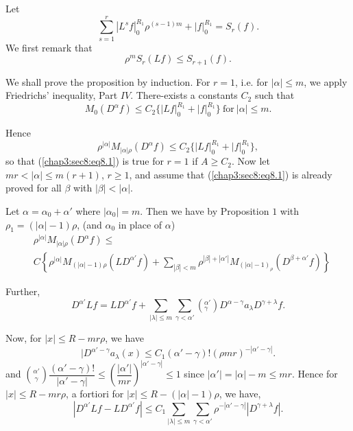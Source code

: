 Let
$$
\sum^r_{s=1} | L^s f |^{R_1}_0 \rho^{(s-1)m} + | f|^{R_1}_0 = S_r (f).
$$
We first remark that 
\begin{equation}
\rho^m S_r (Lf) \leq S_{r+1} (f). \tag{8.3}\label{chap3:sec8:eq8.3}
\end{equation}

We shall prove the proposition by induction. For $r = 1$, i.e. for
$|\alpha| \leq m$, we apply Friedrichs' inequality, Part
$IV$. There-exists a constants $C_2$ such that 
$$
M_0 (D^ \alpha f) \leq C_2 \{ |L f|^{R_1}_0 + |f|^{R_1}_0 \} ~
\text{for} ~ |\alpha| \leq m. 
$$

Hence
$$
\rho^{|\alpha|} M_{| \alpha | \rho} (D^\alpha f) \leq C_2 \{
|Lf|^{R_1}_0 + | f |^{R_1}_0 \}, 
$$
so that (\ref{chap3:sec8:eq8.1}) is true for $r = 1$ if $A \geq C_2$. Now let $mr < |
\alpha| \leq m (r+1)$, $ r \geq 1$, and assume that (\ref{chap3:sec8:eq8.1}) is already
proved for all $\beta$ with $| \beta | < | \alpha |$. 

Let $\alpha = \alpha_0 + \alpha '$ where $| \alpha_0 | = m$. Then we
have by Proposition $1$ with $\rho_1 = (| \alpha| - 1) \rho$,
(and $\alpha_0$ in place of $\alpha$)  
\begin{align*}
&\rho^{|\alpha |} M_{|\alpha | \rho} (D^ \alpha f) \leq\\ 
&C \left\{
  \rho^{|\alpha |} M_{(|\alpha | - 1) \rho} (LD^{\alpha '} f) +
  \sum_{|\beta | < m} \rho^{|\beta | + |\alpha ' |} M_{(|\alpha | -
    1)_\rho} \left(D^{\beta + \alpha'} f\right) \right\}
  \tag{8.4}\label{chap3:sec8:eq8.4}  
\end{align*}

Further,\pageoriginale
$$
D^{\alpha'} Lf = L D^{\alpha'} f + \sum_{|\lambda | \leq m}
\sum_{\gamma < \alpha '} (^{\alpha '}_{\gamma}) D^{\alpha - \gamma} a_
\lambda D^{\gamma + \lambda} f. 
$$

Now, for $|x| \leq R - mr \rho$, we have
$$
|D^{\alpha ' - \gamma} a_{\lambda}(x) \leq C_1 (\alpha ' - \gamma) !
(\rho mr)^{-|\alpha' - \gamma |}. 
$$
and $\binom{\alpha '}{\gamma} \dfrac{(\alpha ' - \gamma )!} {|\alpha ' -
  \gamma |} \leq \left(\dfrac{|\alpha' |}{mr}\right)^{|\alpha' - \gamma |}
\leq1$ since $|\alpha ' | = | \alpha | - m \leq mr$. Hence for $|x|
\leq R - mr \rho$, a fortiori for $|x| \leq R - (| \alpha | - 1)
\rho$, we have, 
\begin{equation}
  | D^{\alpha '} Lf - LD^{\alpha '} f | \leq  C_1 \sum_{|\lambda |
    \leq m} \sum_{\gamma < \alpha'} \rho^{-|\alpha ' - \gamma |} |
  D^{\gamma + \lambda} f |. \tag{8.5}\label{chap3:sec8:eq8.5} 
\end{equation}

